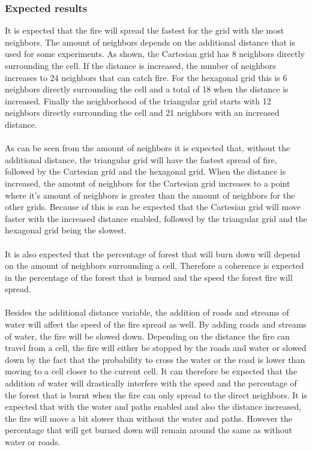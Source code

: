 \documentclass{article}
\begin{document}
\begin{multicols}{2}
\subsubsection*{Expected results}
It is expected that the fire will spread the fastest for the grid with the most neighbors. The amount of neighbors depends on the additional distance that is used for some experiments. As shown, the Cartesian grid has 8 neighbors directly surrounding the cell. If the distance is increased, the number of neighbors increases to 24 neighbors that can catch fire. For the hexagonal grid this is 6 neighbors directly surrounding the cell and a total of 18 when the distance is increased. Finally the neighborhood of the triangular grid starts with 12 neighbors directly surrounding the cell and 21 neighbors with an increased distance.\\\\
As can be seen from the amount of neighbors it is expected that, without the additional distance, the triangular grid will have the fastest spread of fire, followed by the Cartesian grid and the hexagonal grid. When the distance is increased, the amount of neighbors for the Cartesian grid increases to a point where it's amount of neighbors is greater than the amount of neighbors for the other grids. Because of this is can be expected that the Cartesian grid will move faster with the increased distance enabled, followed by the triangular grid and the hexagonal grid being the slowest.\\\\
It is also expected that the percentage of forest that will burn down will depend on the amount of neighbors surrounding a cell. Therefore a coherence is expected in the percentage of the forest that is burned and the speed the forest fire will spread.\\\\
Besides the additional distance variable, the addition of roads and streams of water will affect the speed of the fire spread as well. By adding roads and streams of water, the fire will be slowed down. Depending on the distance the fire can travel from a cell, the fire will either be stopped by the roads and water or slowed down by the fact that the probability to cross the water or the road is lower than moving to a cell closer to the current cell. It can therefore be expected that the addition of water will drastically interfere with the speed and the percentage of the forest that is burnt when the fire can only spread to the direct neighbors. It is expected that with the water and paths enabled and also the distance increased, the fire will move a bit slower than without the water and paths. However the percentage that will get burned down will remain around the same as without water or roads.

\end{multicols}
\end{document}
